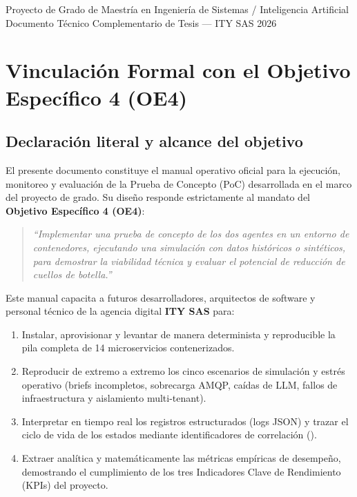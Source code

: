 \documentclass[11pt,a4paper]{article}
\newcommand{\code}[1]{\texttt{\detokenize{#1}}}
\begin{document}
\begin{titlepage}
    \vfill
    {\small \color{darkgray} Proyecto de Grado de Maestría en Ingeniería de Sistemas / Inteligencia Artificial\\
    Documento Técnico Complementario de Tesis --- ITY SAS 2026}
\end{titlepage}

\newpage
\tableofcontents
\newpage

\section{Vinculación Formal con el Objetivo Específico 4 (OE4)}
\label{sec:vinculacion_oe4}

\subsection{Declaración literal y alcance del objetivo}
El presente documento constituye el manual operativo oficial para la ejecución, monitoreo y evaluación de la Prueba de Concepto (PoC) desarrollada en el marco del proyecto de grado. Su diseño responde estrictamente al mandato del \textbf{Objetivo Específico 4 (OE4)}:

\begin{quote}
\textit{``Implementar una prueba de concepto de los dos agentes en un entorno de contenedores, ejecutando una simulación con datos históricos o sintéticos, para demostrar la viabilidad técnica y evaluar el potencial de reducción de cuellos de botella.''}
\end{quote}

Este manual capacita a futuros desarrolladores, arquitectos de software y personal técnico de la agencia digital \textbf{ITY SAS} para:
\begin{enumerate}[leftmargin=*]
    \item Instalar, aprovisionar y levantar de manera determinista y reproducible la pila completa de 14 microservicios contenerizados.
    \item Reproducir de extremo a extremo los cinco escenarios de simulación y estrés operativo (briefs incompletos, sobrecarga AMQP, caídas de LLM, fallos de infraestructura y aislamiento multi-tenant).
    \item Interpretar en tiempo real los registros estructurados (logs JSON) y trazar el ciclo de vida de los estados mediante identificadores de correlación (\code{task_id}).
    \item Extraer analítica y matemáticamente las métricas empíricas de desempeño, demostrando el cumplimiento de los tres Indicadores Clave de Rendimiento (KPIs) del proyecto.
\end{enumerate}
\end{document}

